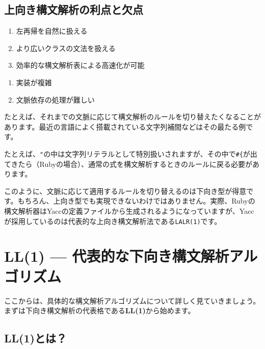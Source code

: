 \subsection{上向き構文解析の利点と欠点}


\begin{enumerate}
\item
  左再帰を自然に扱える
\item
  より広いクラスの文法を扱える
\item
  効率的な構文解析表による高速化が可能
\end{enumerate}


\begin{enumerate}
\item
  実装が複雑
\item
  文脈依存の処理が難しい
\end{enumerate}

たとえば、それまでの文脈に応じて構文解析のルールを切り替えたくなることがあります。最近の言語によく搭載されている文字列補間などはその最たる例です。

たとえば、\texttt{"}の中は文字列リテラルとして特別扱いされますが、その中で\texttt{\#\{}が出てきたら（Rubyの場合）、通常の式を構文解析するときのルールに戻る必要があります。

このように、文脈に応じて適用するルールを切り替えるのは下向き型が得意です。もちろん、上向き型でも実現できないわけではありません。実際、Rubyの構文解析器はYaccの定義ファイルから生成されるようになっていますが、Yaccが採用しているのは代表的な上向き構文解析法である\texttt{LALR(1)}です。

\section{LL(1) --- 代表的な下向き構文解析アルゴリズム}

ここからは、具体的な構文解析アルゴリズムについて詳しく見ていきましょう。まずは下向き構文解析の代表格である\textbf{\sffamily LL(1)}から始めます。

\subsection{LL(1)とは？}

